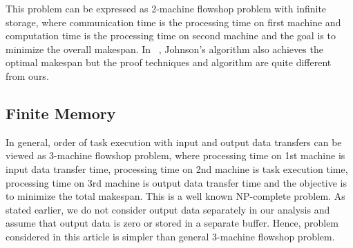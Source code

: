 \documentclass[runningheads]{llncs} %
\begin{document}
This problem can be expressed as 2-machine flowshop problem with infinite storage, where communication time is the processing time on first machine and computation time is the processing time on second machine and the goal is to minimize the overall makespan. In ~\cite{GareyJohnson}, Johnson's algorithm also achieves the optimal makespan but the proof techniques and algorithm are quite different from ours.
	\subsection{Finite Memory}
	
	In general, order of task execution with input and output data transfers can be 
	viewed as  3-machine flowshop problem, where processing time on 1st machine is 
	input data transfer time,  processing time on 2nd machine is task execution time, 
	processing time on 3rd machine is output data transfer time  and the objective is 
	to minimize the total makespan. This is a well known NP-complete problem. 
	As stated earlier, we do not consider output data separately in our analysis and assume that output data is zero or stored in a separate buffer. Hence, problem considered in this article is simpler than general 3-machine flowshop problem.
	
\end{document}
